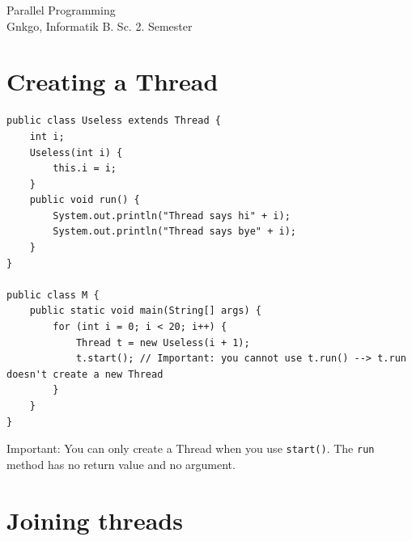 \documentclass{article}
\begin{document}
\begin{titlepage}
    \thispagestyle{fancy}
    \renewcommand{\headrulewidth}{1pt}

    \center
    \vspace*{1.0cm}
    \Large Parallel Programming \\[.5 cm]
    \large
    \normalsize
    Gnkgo, Informatik B. Sc. 2. Semester \\
    \vfill
\end{titlepage}

\tableofcontents
\newpage %




\lstset{style=mystyle}



\section{Creating a Thread}

\begin{lstlisting}
public class Useless extends Thread {
    int i;
    Useless(int i) {
        this.i = i;
    }
    public void run() {
        System.out.println("Thread says hi" + i);
        System.out.println("Thread says bye" + i);
    }
}

public class M {
    public static void main(String[] args) {
        for (int i = 0; i < 20; i++) {
            Thread t = new Useless(i + 1);
            t.start(); // Important: you cannot use t.run() --> t.run doesn't create a new Thread
        }
    }
}
\end{lstlisting}

Important: You can only create a Thread when you use \texttt{start()}. The \texttt{run} method has no return value and no argument.

\section{Joining threads}
\end{document}
